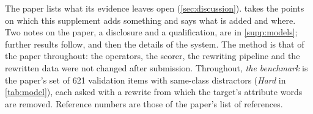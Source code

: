 \newsavebox{\promptsavebox}
\newenvironment{promptframe}{\begin{lrbox}{\promptsavebox}\begin{minipage}{\dimexpr\linewidth-2\fboxsep-1.6pt\relax}\footnotesize\sffamily\setlength{\parskip}{3pt}\raggedright}{\end{minipage}\end{lrbox}\noindent{\setlength{\fboxrule}{0.8pt}\fcolorbox{promptrule}{promptbg}{\usebox{\promptsavebox}}}}
\newcommand{\boxref}[1]{Box~\ref{#1}}%
\newcommand{\promptcaption}[2]{\par\vspace{4pt}\refstepcounter{promptbox}\label{#1}{\small\textbf{Box \thepromptbox.} #2 Text inside the frame is input to the model, reproduced verbatim; [\ldots] marks an omission.\par}}
\noindent The paper lists what its evidence leaves open (\cref{sec:discussion}).
 takes the points on which this supplement adds something and says what is added and where.
Two notes on the paper, a disclosure and a qualification, are in \cref{supp:models}; further results follow, and then the details of the system.
The method is that of the paper throughout: the operators, the scorer, the rewriting pipeline and the rewritten data were not changed after submission.
Throughout, \emph{the benchmark} is the paper's set of 621 validation items with same-class distractors (\emph{Hard} in \cref{tab:model}), each asked with a rewrite from which the target's attribute words are removed.
Reference numbers are those of the paper's list of references.

